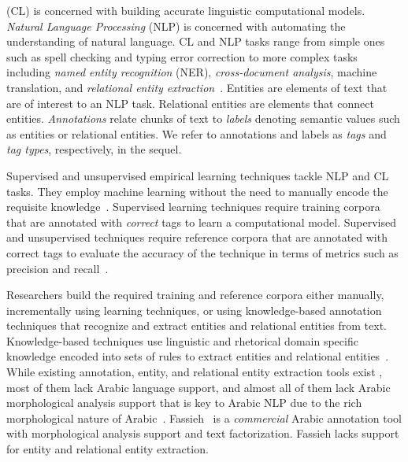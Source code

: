  (CL) is concerned with building 
accurate linguistic computational models. 
{\em Natural Language Processing} (NLP) is concerned with automating the 
understanding of natural language. 
CL and NLP tasks range from simple ones such as spell checking and typing 
error correction to more 
complex tasks including %
{\em named entity recognition} (NER), {\em cross-document analysis}, 
machine translation, 
and {\em relational entity extraction}~\cite{linckels2011natural,ferilli2011natural}.
Entities are elements of text that are of interest to an NLP task. 
Relational entities are elements that connect entities. 
{\em Annotations} relate chunks of text to {\em labels} denoting
semantic values such as entities or relational entities.
We refer to annotations and labels as {\em tags} and {\em tag types}, respectively, 
in the sequel.

Supervised and unsupervised empirical learning techniques tackle NLP and CL tasks. 
They employ machine learning without the need to manually encode the requisite 
knowledge~\cite{soudi2007arabic}. 
Supervised learning techniques require training corpora that are annotated 
with {\em correct} tags to learn a computational model. 
Supervised and unsupervised techniques require reference corpora that are
annotated with correct tags to evaluate the 
accuracy of the technique in terms of metrics such as precision and 
recall~\cite{englishtreebank,arabictreebank,chinesetreebank}. 

Researchers build the required %
training and reference corpora 
either manually, incrementally using learning techniques, or using knowledge-based 
annotation techniques that recognize and extract entities and relational 
entities from text. 
Knowledge-based techniques use linguistic and 
rhetorical domain specific knowledge encoded into sets of rules 
to extract entities and relational entities~\cite{soudi2007arabic}.
While existing annotation, entity, and relational entity 
extraction tools exist
\cite{chiticariu2010systemt%
,atzmueller2008rule%
,urbain2012user%
,settles2011closing%
,mmax2%
,brat%
},
most of them lack Arabic language support, and almost all of them
lack Arabic morphological analysis support that is key to Arabic NLP
due to the rich morphological nature of Arabic~\cite{habash2006arabic}. 
Fassieh~\cite{attia2009fassieh} is a {\em commercial} Arabic annotation tool
with morphological analysis support and text factorization. 
Fassieh lacks support for entity and relational entity extraction.

